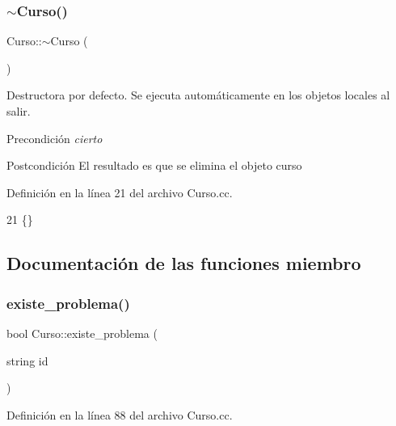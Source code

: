 \subsubsection{\texorpdfstring{$\sim$\+Curso()}{~Curso()}}
{\footnotesize\ttfamily Curso\+::$\sim$\+Curso (\begin{DoxyParamCaption}{ }\end{DoxyParamCaption})}



Destructora por defecto. Se ejecuta automáticamente en los objetos locales al salir. 

\begin{DoxyPrecond}{Precondición}
{\itshape cierto} 
\end{DoxyPrecond}
\begin{DoxyPostcond}{Postcondición}
El resultado es que se elimina el objeto curso 
\end{DoxyPostcond}


Definición en la línea 21 del archivo Curso.\+cc.


\begin{DoxyCode}
21 \{\}
\end{DoxyCode}


\subsection{Documentación de las funciones miembro}
\mbox{\label{class_curso_ac697ad831382b4e3ccd85365e835344f}} 
\subsubsection{\texorpdfstring{existe\+\_\+problema()}{existe\_problema()}}
{\footnotesize\ttfamily bool Curso\+::existe\+\_\+problema (\begin{DoxyParamCaption}\item[{string}]{id }\end{DoxyParamCaption})\hspace{0.3cm}{\ttfamily [private]}}



Definición en la línea 88 del archivo Curso.\+cc.


